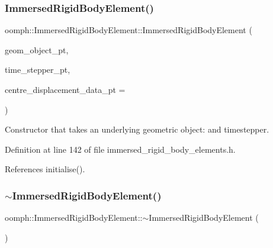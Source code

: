 \subsubsection{\texorpdfstring{Immersed\+Rigid\+Body\+Element()}{ImmersedRigidBodyElement()}\hspace{0.1cm}{\footnotesize\ttfamily [2/2]}}
{\footnotesize\ttfamily oomph\+::\+Immersed\+Rigid\+Body\+Element\+::\+Immersed\+Rigid\+Body\+Element (\begin{DoxyParamCaption}\item[{\hyperlink{classoomph_1_1GeomObject}{Geom\+Object} $\ast$const \&}]{geom\+\_\+object\+\_\+pt,  }\item[{\hyperlink{classoomph_1_1TimeStepper}{Time\+Stepper} $\ast$const \&}]{time\+\_\+stepper\+\_\+pt,  }\item[{\hyperlink{classoomph_1_1Data}{Data} $\ast$const \&}]{centre\+\_\+displacement\+\_\+data\+\_\+pt = {} }\end{DoxyParamCaption})\hspace{0.3cm}{\ttfamily [inline]}}



Constructor that takes an underlying geometric object\+: and timestepper. 



Definition at line 142 of file immersed\+\_\+rigid\+\_\+body\+\_\+elements.\+h.



References initialise().

\mbox{\label{classoomph_1_1ImmersedRigidBodyElement_a60dd9497b3e0713719dfb4b08989eb4c}} 
\subsubsection{\texorpdfstring{$\sim$\+Immersed\+Rigid\+Body\+Element()}{~ImmersedRigidBodyElement()}}
{\footnotesize\ttfamily oomph\+::\+Immersed\+Rigid\+Body\+Element\+::$\sim$\+Immersed\+Rigid\+Body\+Element (\begin{DoxyParamCaption}{ }\end{DoxyParamCaption})\hspace{0.3cm}{\ttfamily [inline]}}



